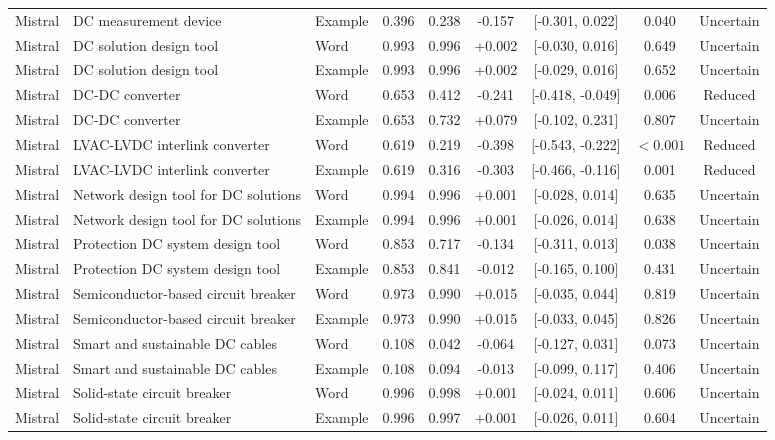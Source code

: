 \begin{landscape}
\begin{longtable}{lllcccccc}
Mistral & DC measurement device & Example & 0.396 & 0.238 & -0.157 & [-0.301, 0.022] & 0.040 & Uncertain \\
Mistral & DC solution design tool & Word & 0.993 & 0.996 & +0.002 & [-0.030, 0.016] & 0.649 & Uncertain \\
Mistral & DC solution design tool & Example & 0.993 & 0.996 & +0.002 & [-0.029, 0.016] & 0.652 & Uncertain \\
Mistral & DC-DC converter & Word & 0.653 & 0.412 & -0.241 & [-0.418, -0.049] & 0.006 & Reduced \\
Mistral & DC-DC converter & Example & 0.653 & 0.732 & +0.079 & [-0.102, 0.231] & 0.807 & Uncertain \\
Mistral & LVAC-LVDC interlink converter & Word & 0.619 & 0.219 & -0.398 & [-0.543, -0.222] & $<0.001$ & Reduced \\
Mistral & LVAC-LVDC interlink converter & Example & 0.619 & 0.316 & -0.303 & [-0.466, -0.116] & 0.001 & Reduced \\
Mistral & Network design tool for DC solutions & Word & 0.994 & 0.996 & +0.001 & [-0.028, 0.014] & 0.635 & Uncertain \\
Mistral & Network design tool for DC solutions & Example & 0.994 & 0.996 & +0.001 & [-0.026, 0.014] & 0.638 & Uncertain \\
Mistral & Protection DC system design tool & Word & 0.853 & 0.717 & -0.134 & [-0.311, 0.013] & 0.038 & Uncertain \\
Mistral & Protection DC system design tool & Example & 0.853 & 0.841 & -0.012 & [-0.165, 0.100] & 0.431 & Uncertain \\
Mistral & Semiconductor-based circuit breaker & Word & 0.973 & 0.990 & +0.015 & [-0.035, 0.044] & 0.819 & Uncertain \\
Mistral & Semiconductor-based circuit breaker & Example & 0.973 & 0.990 & +0.015 & [-0.033, 0.045] & 0.826 & Uncertain \\
Mistral & Smart and sustainable DC cables & Word & 0.108 & 0.042 & -0.064 & [-0.127, 0.031] & 0.073 & Uncertain \\
Mistral & Smart and sustainable DC cables & Example & 0.108 & 0.094 & -0.013 & [-0.099, 0.117] & 0.406 & Uncertain \\
Mistral & Solid-state circuit breaker & Word & 0.996 & 0.998 & +0.001 & [-0.024, 0.011] & 0.606 & Uncertain \\
Mistral & Solid-state circuit breaker & Example & 0.996 & 0.997 & +0.001 & [-0.026, 0.011] & 0.604 & Uncertain \\

\end{longtable}
\end{landscape}

